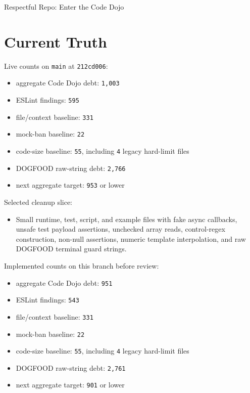 \begin{CodeBlock}
Respectful Repo: Enter the Code Dojo
\end{CodeBlock}

\section{Current Truth}\label{record-236-current-truth}

Live counts on \texttt{m\allowbreak{}a\allowbreak{}i\allowbreak{}n} at \texttt{2\allowbreak{}1\allowbreak{}2\allowbreak{}c\allowbreak{}d\allowbreak{}0\allowbreak{}0\allowbreak{}6}:

\begin{itemize}
\tightlist
\item
  aggregate Code Dojo debt: \texttt{1\allowbreak{},\allowbreak{}0\allowbreak{}0\allowbreak{}3}
\item
  ESLint findings: \texttt{5\allowbreak{}9\allowbreak{}5}
\item
  file/context baseline: \texttt{3\allowbreak{}3\allowbreak{}1}
\item
  mock-ban baseline: \texttt{2\allowbreak{}2}
\item
  code-size baseline: \texttt{5\allowbreak{}5}, including \texttt{4} legacy hard-limit files
\item
  DOGFOOD raw-string debt: \texttt{2\allowbreak{},\allowbreak{}7\allowbreak{}6\allowbreak{}6}
\item
  next aggregate target: \texttt{9\allowbreak{}5\allowbreak{}3} or lower
\end{itemize}

Selected cleanup slice:

\begin{itemize}
\tightlist
\item
  Small runtime, test, script, and example files with fake async callbacks, unsafe test payload assertions, unchecked array reads, control-regex construction, non-null assertions, numeric template interpolation, and raw DOGFOOD terminal guard strings.
\end{itemize}

Implemented counts on this branch before review:

\begin{itemize}
\tightlist
\item
  aggregate Code Dojo debt: \texttt{9\allowbreak{}5\allowbreak{}1}
\item
  ESLint findings: \texttt{5\allowbreak{}4\allowbreak{}3}
\item
  file/context baseline: \texttt{3\allowbreak{}3\allowbreak{}1}
\item
  mock-ban baseline: \texttt{2\allowbreak{}2}
\item
  code-size baseline: \texttt{5\allowbreak{}5}, including \texttt{4} legacy hard-limit files
\item
  DOGFOOD raw-string debt: \texttt{2\allowbreak{},\allowbreak{}7\allowbreak{}6\allowbreak{}1}
\item
  next aggregate target: \texttt{9\allowbreak{}0\allowbreak{}1} or lower
\end{itemize}

